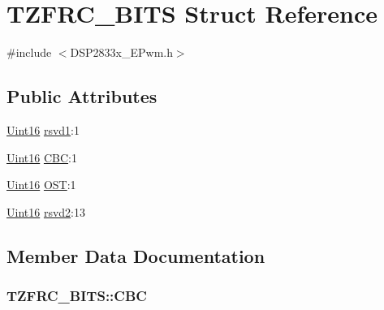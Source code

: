 \hypertarget{struct_t_z_f_r_c___b_i_t_s}{}\section{T\+Z\+F\+R\+C\+\_\+\+B\+I\+T\+S Struct Reference}
\label{struct_t_z_f_r_c___b_i_t_s}


{\ttfamily \#include $<$D\+S\+P2833x\+\_\+\+E\+Pwm.\+h$>$}

\subsection*{Public Attributes}
\begin{DoxyCompactItemize}
\item 
\hyperlink{_d_s_p2833x___device_8h_a59a9f6be4562c327cbfb4f7e8e18f08b}{Uint16} \hyperlink{struct_t_z_f_r_c___b_i_t_s_aef9312e1fcf1d83836cb3c081477eadc}{rsvd1}\+:1
\item 
\hyperlink{_d_s_p2833x___device_8h_a59a9f6be4562c327cbfb4f7e8e18f08b}{Uint16} \hyperlink{struct_t_z_f_r_c___b_i_t_s_a98e55a1cc97e3fc2f0447b924f1e905a}{C\+B\+C}\+:1
\item 
\hyperlink{_d_s_p2833x___device_8h_a59a9f6be4562c327cbfb4f7e8e18f08b}{Uint16} \hyperlink{struct_t_z_f_r_c___b_i_t_s_a2826e90b0c2cc347930bf3805519bd10}{O\+S\+T}\+:1
\item 
\hyperlink{_d_s_p2833x___device_8h_a59a9f6be4562c327cbfb4f7e8e18f08b}{Uint16} \hyperlink{struct_t_z_f_r_c___b_i_t_s_ac63811b78881cd2ef7ad907d51f15a74}{rsvd2}\+:13
\end{DoxyCompactItemize}


\subsection{Member Data Documentation}
\hypertarget{struct_t_z_f_r_c___b_i_t_s_a98e55a1cc97e3fc2f0447b924f1e905a}{}
\subsubsection[{C\+B\+C}]{ T\+Z\+F\+R\+C\+\_\+\+B\+I\+T\+S\+::\+C\+B\+C}\label{struct_t_z_f_r_c___b_i_t_s_a98e55a1cc97e3fc2f0447b924f1e905a}
\hypertarget{struct_t_z_f_r_c___b_i_t_s_a2826e90b0c2cc347930bf3805519bd10}{}
